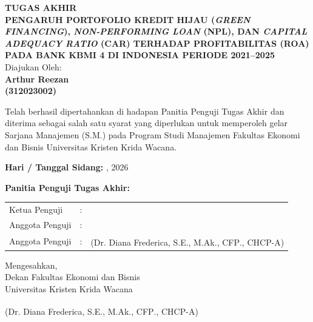\documentclass[12pt,a4paper]{article}
\newcommand{\ukrida}{Universitas Kristen Krida Wacana}
\newcommand{\nahamahasiswa}{Arthur Reezan}
\newcommand{\nim}{312023002}
\newcommand{\dosbim}{Dr. Diana Frederica, S.E., M.Ak., CFP\textsuperscript{\textregistered}., CHCP-A}
\newcommand{\dekan}{Dr. Diana Frederica, S.E., M.Ak., CFP\textsuperscript{\textregistered}., CHCP-A}
\numberwithin{equation}{section}
\begin{document}
\newpage
\thispagestyle{frontmatter}
\begin{center}
  {\large\bfseries TUGAS AKHIR}\\[0.6cm]
  {\large\bfseries
    PENGARUH PORTOFOLIO KREDIT HIJAU (\emph{GREEN FINANCING}),
    \emph{NON-PERFORMING LOAN} (NPL), DAN
    \emph{CAPITAL ADEQUACY RATIO} (CAR)
    TERHADAP PROFITABILITAS (ROA) PADA BANK KBMI 4
    DI INDONESIA PERIODE 2021--2025
  }\\[0.6cm]
  {\normalsize Diajukan Oleh:}\\[0.3cm]
  {\large\bfseries \nahamahasiswa}\\[0.2cm]
  {\large\bfseries (\nim)}
\end{center}

\vspace{0.4cm}
\noindent
Telah berhasil dipertahankan di hadapan Panitia Penguji Tugas Akhir dan diterima sebagai salah satu syarat yang diperlukan untuk memperoleh gelar Sarjana Manajemen (S.M.) pada Program Studi Manajemen Fakultas Ekonomi dan Bisnis Universitas Kristen Krida Wacana.

\vspace{0.4cm}
\noindent \textbf{Hari / Tanggal Sidang:} \underline{\hspace{4cm}}, \underline{\hspace{3cm}} 2026

\vspace{0.4cm}
\noindent \textbf{Panitia Penguji Tugas Akhir:}

\vspace{0.3cm}
\noindent
\begin{tabular}{lll}
  Ketua Penguji   & : & \underline{\hspace{6cm}} \\[1.5cm]
  Anggota Penguji & : & \underline{\hspace{6cm}} \\[1.5cm]
  Anggota Penguji & : & (\dosbim) \\
\end{tabular}

\vspace{0.8cm}
\noindent Mengesahkan,\\
Dekan Fakultas Ekonomi dan Bisnis\\
\ukrida

\vspace{2.2cm}
\noindent (\dekan)
\end{document}
